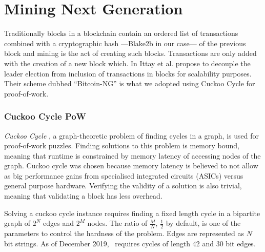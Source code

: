 \section{Mining Next Generation}
\label{sect:mining}

Traditionally blocks in a blockchain contain an ordered list of transactions
combined with a cryptographic hash ---Blake2b \cite{aumasson2013blake2} in our
case--- of the previous block \cite{whatisablockchain,raikwar2019sok} and mining
is the act of creating such blocks. Transactions are only added with the
creation of a new block which. In \cite{Eyal:2016:BSB:2930611.2930615}
Ittay et al. propose to decouple the leader election from inclusion of
transactions in blocks for scalability purposes. Their scheme dubbed
\enquote{Bitcoin-NG} is what we adopted using Cuckoo Cycle for proof-of-work.


\subsubsection{Cuckoo Cycle PoW}

\textit{Cuckoo Cycle} \cite{Tromp2015CuckooCA}, a graph-theoretic problem of
finding cycles in a graph, is used for proof-of-work puzzles. Finding solutions
to this problem is memory bound, meaning that runtime is constrained by memory
latency of accessing nodes of the graph. Cuckoo cycle was chosen because memory
latency is believed to not allow as big performance gains from specialised
integrated circuits (ASICs) versus general purpose hardware. Verifying the
validity of a solution is also trivial, meaning that validating a block has
less overhead.

Solving a cuckoo cycle instance requires finding a fixed length cycle in a
bipartite graph of $2^N$ edges and $2^M$ nodes. The ratio of $\frac{M}{N}$,
$\frac{1}{2}$ by default, is one of the parameters to control the hardness of
the problem. Edges are represented as $N$ bit strings.
As of December 2019, \aet\ requires cycles of length 42 and 30 bit edges.

